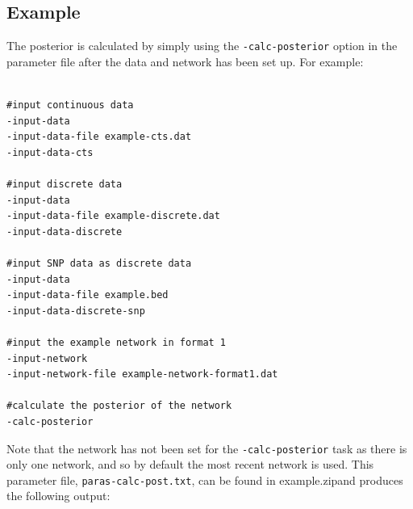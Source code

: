 \documentclass[a4paper,12pt]{article}
\newcommand{\code}[1]{{\footnotesize{{\tt #1}}}}
\begin{document}

\subsection{Example}
\label{calc-post-example}

The posterior is calculated by simply using the \code{-calc-posterior} option in the parameter file after the data and network has been set up. For example: 
\vspace{0.35cm} \begin{lstlisting}

#input continuous data
-input-data
-input-data-file example-cts.dat
-input-data-cts

#input discrete data
-input-data
-input-data-file example-discrete.dat
-input-data-discrete

#input SNP data as discrete data
-input-data
-input-data-file example.bed
-input-data-discrete-snp

#input the example network in format 1
-input-network
-input-network-file example-network-format1.dat

#calculate the posterior of the network
-calc-posterior

\end{lstlisting} \vspace{0.35cm}
Note that the network has not been set for the \code{-calc-posterior} task as there is only one network, and so by default the most recent network is used. This parameter file, \code{paras-calc-post.txt}, can be found in example.zipand produces the following output: 
\end{document}
